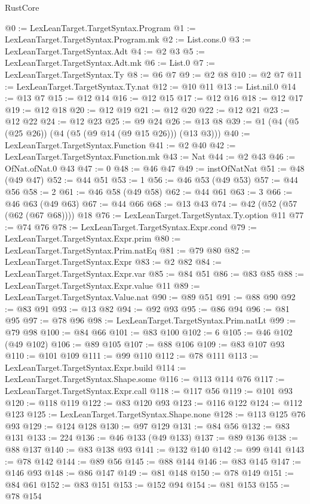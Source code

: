 \begin{lexlean}{RustCore}
\begin{coremodule}
@0 := LexLeanTarget.TargetSyntax.Program
@1 := LexLeanTarget.TargetSyntax.Program.mk
@2 := List.cons.{0}
@3 := LexLeanTarget.TargetSyntax.Adt
@4 := @2 @3
@5 := LexLeanTarget.TargetSyntax.Adt.mk
@6 := List.{0}
@7 := LexLeanTarget.TargetSyntax.Ty
@8 := @6 @7
@9 := @2 @8
@10 := @2 @7
@11 := LexLeanTarget.TargetSyntax.Ty.nat
@12 := @10 @11
@13 := List.nil.{0}
@14 := @13 @7
@15 := @12 @14
@16 := @12 @15
@17 := @12 @16
@18 := @12 @17
@19 := @12 @18
@20 := @12 @19
@21 := @12 @20
@22 := @12 @21
@23 := @12 @22
@24 := @12 @23
@25 := @9 @24
@26 := @13 @8
@39 := @1 (@4 (@5 (@25 @26)) (@4 (@5 (@9 @14 (@9 @15 @26))) (@13 @3)))
@40 := LexLeanTarget.TargetSyntax.Function
@41 := @2 @40
@42 := LexLeanTarget.TargetSyntax.Function.mk
@43 := Nat
@44 := @2 @43
@46 := OfNat.ofNat.{0} @43
@47 := 0
@48 := @46 @47
@49 := instOfNatNat
@51 := @48 (@49 @47)
@52 := @44 @51
@53 := 1
@56 := @46 @53 (@49 @53)
@57 := @44 @56
@58 := 2
@61 := @46 @58 (@49 @58)
@62 := @44 @61
@63 := 3
@66 := @46 @63 (@49 @63)
@67 := @44 @66
@68 := @13 @43
@74 := @42 (@52 (@57 (@62 (@67 @68)))) @18
@76 := LexLeanTarget.TargetSyntax.Ty.option @11
@77 := @74 @76
@78 := LexLeanTarget.TargetSyntax.Expr.cond
@79 := LexLeanTarget.TargetSyntax.Expr.prim
@80 := LexLeanTarget.TargetSyntax.Prim.natEq
@81 := @79 @80
@82 := LexLeanTarget.TargetSyntax.Expr
@83 := @2 @82
@84 := LexLeanTarget.TargetSyntax.Expr.var
@85 := @84 @51
@86 := @83 @85
@88 := LexLeanTarget.TargetSyntax.Expr.value @11
@89 := LexLeanTarget.TargetSyntax.Value.nat
@90 := @89 @51
@91 := @88 @90
@92 := @83 @91
@93 := @13 @82
@94 := @92 @93
@95 := @86 @94
@96 := @81 @95
@97 := @78 @96
@98 := LexLeanTarget.TargetSyntax.Prim.natLt
@99 := @79 @98
@100 := @84 @66
@101 := @83 @100
@102 := 6
@105 := @46 @102 (@49 @102)
@106 := @89 @105
@107 := @88 @106
@109 := @83 @107 @93
@110 := @101 @109
@111 := @99 @110
@112 := @78 @111
@113 := LexLeanTarget.TargetSyntax.Expr.build
@114 := LexLeanTarget.TargetSyntax.Shape.some
@116 := @113 @114 @76
@117 := LexLeanTarget.TargetSyntax.Expr.call
@118 := @117 @56
@119 := @101 @93
@120 := @118 @119
@122 := @83 @120 @93
@123 := @116 @122
@124 := @112 @123
@125 := LexLeanTarget.TargetSyntax.Shape.none
@128 := @113 @125 @76 @93
@129 := @124 @128
@130 := @97 @129
@131 := @84 @56
@132 := @83 @131
@133 := 224
@136 := @46 @133 (@49 @133)
@137 := @89 @136
@138 := @88 @137
@140 := @83 @138 @93
@141 := @132 @140
@142 := @99 @141
@143 := @78 @142
@144 := @89 @56
@145 := @88 @144
@146 := @83 @145
@147 := @146 @93
@148 := @86 @147
@149 := @81 @148
@150 := @78 @149
@151 := @84 @61
@152 := @83 @151
@153 := @152 @94
@154 := @81 @153
@155 := @78 @154

\end{coremodule}
\end{lexlean}
